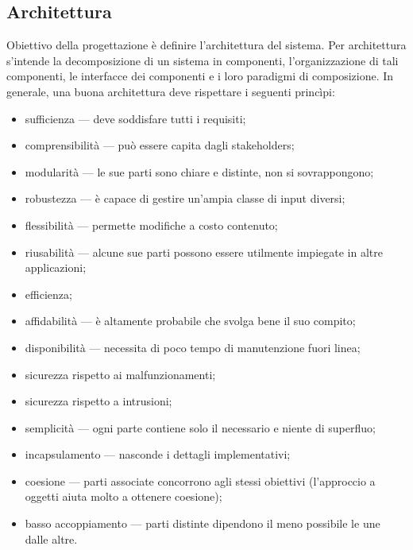 \documentclass[a4paper]{article}
\begin{document}
		
	\subsection{Architettura}

		
Obiettivo della progettazione è definire l'architettura del sistema. Per architettura s'intende la decomposizione di un sistema in componenti, l'organizzazione di tali componenti, le interfacce dei componenti e i loro paradigmi di composizione. In generale, una buona architettura deve rispettare i seguenti princìpi:
		
	\begin{itemize}
		
			
	\item sufficienza — deve soddisfare tutti i requisiti;
			
	\item comprensibilità — può essere capita dagli stakeholders;
			
	\item modularità — le sue parti sono chiare e distinte, non si sovrappongono;
			
	\item robustezza — è capace di gestire un'ampia classe di input diversi;
			
	\item flessibilità — permette modifiche a costo contenuto;
			
	\item riusabilità — alcune sue parti possono essere utilmente impiegate in altre applicazioni;
			
	\item efficienza;
			
	\item affidabilità — è altamente probabile che svolga bene il suo compito;
			
	\item disponibilità — necessita di poco tempo di manutenzione fuori linea;
			
	\item sicurezza rispetto ai malfunzionamenti;
			
	\item sicurezza rispetto a intrusioni;
			
	\item semplicità — ogni parte contiene solo il necessario e niente di superfluo;
			
	\item incapsulamento — nasconde i dettagli implementativi;
			
	\item coesione — parti associate concorrono agli stessi obiettivi (l'approccio a oggetti aiuta molto a ottenere coesione);
			
	\item basso accoppiamento — parti distinte dipendono il meno possibile le une dalle altre.
		
	\end{itemize}
\end{document}
